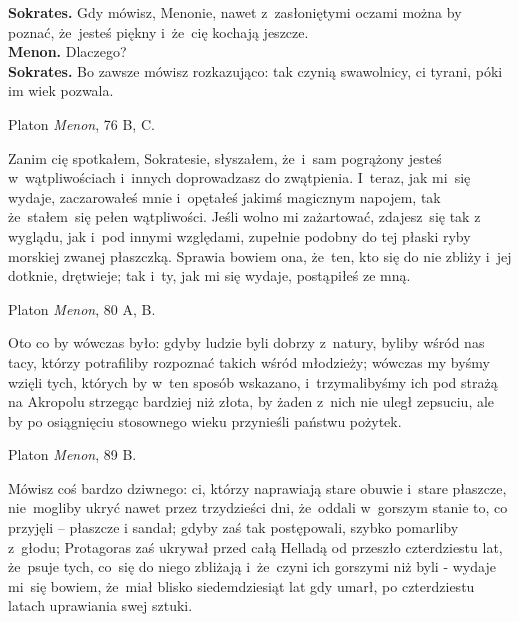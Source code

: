 \documentclass[a4paper,11pt]{article}
\newcommand{\attribA}[1]{#1}
\begin{document}
\noindent
\textbf{Sokrates.} Gdy mówisz, Menonie, nawet z~zasłoniętymi oczami
można by poznać, że~jesteś piękny i~że~cię kochają jeszcze. \\
\textbf{Menon.} Dlaczego? \\
\textbf{Sokrates.} Bo zawsze mówisz rozkazująco: tak czynią
swawolnicy, ci tyrani, póki im wiek pozwala.


\attribA{Platon \textit{Menon}, 76 B, C.}

\vspace{\spaceThree}



\noindent
Zanim cię spotkałem, Sokratesie, słyszałem, że~i~sam pogrążony jesteś
w~wątpliwościach i~innych doprowadzasz do zwątpienia. I~teraz, jak
mi~się wydaje, zaczarowałeś mnie i~opętałeś jakimś magicznym napojem,
tak że~stałem~się pełen wątpliwości. Jeśli wolno mi zażartować,
zdajesz~się tak z wyglądu, jak i~pod innymi względami, zupełnie
podobny do tej płaski ryby morskiej zwanej płaszczką. Sprawia bowiem
ona, że~ten, kto się do nie zbliży i~jej dotknie, drętwieje; tak i~ty,
jak mi się wydaje, postąpiłeś ze mną.


\attribA{Platon \textit{Menon}, 80 A, B.}

\vspace{\spaceThree}



\noindent
Oto co by wówczas było: gdyby ludzie byli dobrzy z~natury, byliby
wśród nas tacy, którzy potrafiliby rozpoznać takich wśród młodzieży;
wówczas my byśmy wzięli tych, których by w~ten sposób wskazano,
i~trzymalibyśmy ich pod strażą na Akropolu strzegąc bardziej niż
złota, by żaden z~nich nie uległ zepsuciu, ale by po osiągnięciu
stosownego wieku przynieśli państwu pożytek.


\attribA{Platon \textit{Menon}, 89 B.}

\vspace{\spaceThree}



\noindent
Mówisz coś bardzo dziwnego: ci, którzy naprawiają stare obuwie i~stare
płaszcze, nie~mogliby ukryć nawet przez trzydzieści dni, że~oddali
w~gorszym stanie to, co przyjęli -- płaszcze i sandał; gdyby zaś tak
postępowali, szybko pomarliby z~głodu; Protagoras zaś ukrywał przed
całą Helladą od przeszło czterdziestu lat, że~psuje tych, co~się do
niego zbliżają i~że~czyni ich gorszymi niż byli - wydaje mi~się
bowiem, że~miał blisko siedemdziesiąt lat gdy umarł, po czterdziestu
latach uprawiania swej sztuki.
\end{document}
